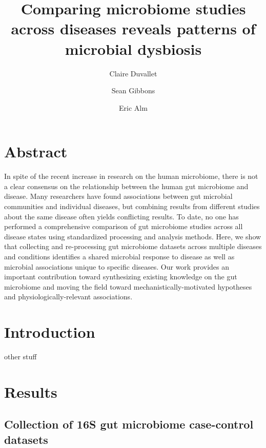\documentclass{article}
\begin{document}
\title{Comparing microbiome studies across diseases reveals patterns of microbial dysbiosis}
\author{Claire Duvallet}
\author{Sean Gibbons}
\author{Eric Alm}
\date{}

\maketitle

\tableofcontents

\section{Abstract}
In spite of the recent increase in research on the human 
microbiome, there is not a clear consensus on the relationship between 
the human gut microbiome and disease. 
Many researchers have found associations between gut microbial 
communities and individual diseases, but combining results from 
different studies about the same disease often yields conflicting results. To date, no one has
performed a comprehensive comparison of gut microbiome 
studies across all disease states using standardized processing
and analysis methods.
Here, we show that collecting and re-processing gut microbiome datasets
across multiple diseases and conditions identifies a shared microbial response 
to disease as well as microbial associations unique to specific diseases.
Our work provides an important contribution toward synthesizing existing knowledge on the
gut microbiome and moving the field toward mechanistically-motivated hypotheses
and physiologically-relevant associations.

\section{Introduction}
other stuff

\section{Results}

\subsection{Collection of 16S gut microbiome case-control datasets}
\end{document}
